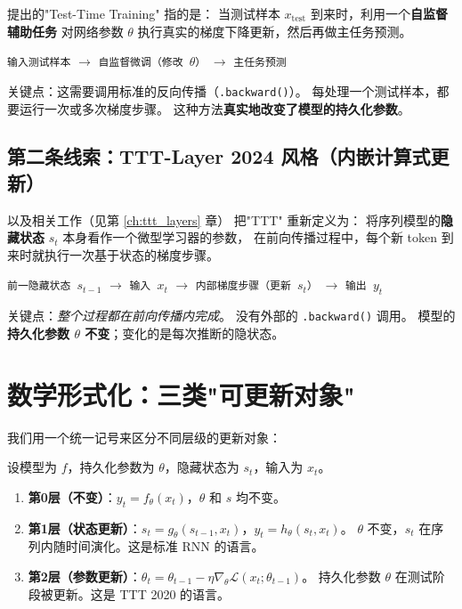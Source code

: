 \citet{sun2020ttt} 提出的"Test-Time Training" 指的是：
当测试样本 $x_\text{test}$ 到来时，利用一个\textbf{自监督辅助任务}
对网络参数 $\theta$ 执行真实的梯度下降更新，然后再做主任务预测。

\begin{center}
\texttt{输入测试样本} $\to$ \texttt{自监督微调（修改 $\theta$）} $\to$ \texttt{主任务预测}
\end{center}

关键点：这需要调用标准的反向传播（\texttt{.backward()}）。
每处理一个测试样本，都要运行一次或多次梯度步骤。
这种方法\textbf{真实地改变了模型的持久化参数}。

\subsection*{第二条线索：TTT-Layer 2024 风格（内嵌计算式更新）}

\citet{sun2024ttt} 以及相关工作（见第 \ref{ch:ttt_layers} 章）
把"TTT" 重新定义为：
将序列模型的\textbf{隐藏状态} $s_t$ 本身看作一个微型学习器的参数，
在前向传播过程中，每个新 token 到来时就执行一次基于状态的梯度步骤。

\begin{center}
\texttt{前一隐藏状态 $s_{t-1}$} $\to$ \texttt{输入 $x_t$} $\to$
\texttt{内部梯度步骤（更新 $s_t$）} $\to$ \texttt{输出 $y_t$}
\end{center}

关键点：\emph{整个过程都在前向传播内完成}。
没有外部的 \texttt{.backward()} 调用。
模型的\textbf{持久化参数 $\theta$ 不变}；变化的是每次推断的隐状态。

\section{数学形式化：三类"可更新对象"}

我们用一个统一记号来区分不同层级的更新对象：

\begin{definition}[推断期更新的三个层级]
设模型为 $f$，持久化参数为 $\theta$，隐藏状态为 $s_t$，输入为 $x_t$。
\begin{enumerate}
  \item \textbf{第0层（不变）}：$y_t = f_\theta(x_t)$，$\theta$ 和 $s$ 均不变。
  \item \textbf{第1层（状态更新）}：$s_t = g_\theta(s_{t-1}, x_t)$，$y_t = h_\theta(s_t, x_t)$。
        $\theta$ 不变，$s_t$ 在序列内随时间演化。这是标准 RNN 的语言。
  \item \textbf{第2层（参数更新）}：$\theta_t = \theta_{t-1} - \eta \nabla_\theta \mathcal{L}(x_t; \theta_{t-1})$。
        持久化参数 $\theta$ 在测试阶段被更新。这是 TTT 2020 的语言。
\end{enumerate}
\end{definition}

